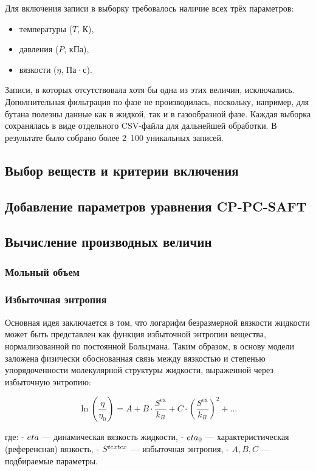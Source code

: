 \documentclass[a4paper,12pt]{article}
\begin{document}
  Для включения записи в выборку требовалось наличие всех трёх параметров:
  \begin{itemize}
    \item температуры (\( T \), К),
    \item давления (\( P \), кПа),
    \item вязкости (\( \eta \), Па·с).
  \end{itemize}
  
  Записи, в которых отсутствовала хотя бы одна из этих величин, исключались. Дополнительная фильтрация по фазе не производилась, поскольку, например, для бутана полезны данные как в жидкой, так и в газообразной фазе. Каждая выборка сохранялась в виде отдельного CSV-файла для дальнейшей обработки. В результате было собрано более 2~100 уникальных записей.
  
  \subsection{Выбор веществ и критерии включения}
  \subsection{Добавление параметров уравнения CP-PC-SAFT}
  \subsection{Вычисление производных величин}
    \subsubsection{Мольный объем}
    \subsubsection{Избыточная энтропия}

Основная идея заключается в том, что логарифм безразмерной вязкости жидкости может быть представлен как функция избыточной энтропии вещества, нормализованной по постоянной Больцмана. Таким образом, в основу модели заложена физически обоснованная связь между вязкостью и степенью упорядоченности молекулярной структуры жидкости, выраженной через избыточную энтропию:

\[
\ln \left( \frac{\eta}{\eta_0} \right) = A + B \cdot \frac{S^{\text{ex}}}{k_B} + C \cdot \left(\frac{S^{\text{ex}}}{k_B} \right)^2 + \ldots
\]

где:
- \( \\eta \) — динамическая вязкость жидкости,
- \( \\eta_0 \) — характеристическая (референсная) вязкость,
- \( S^{\\text{ex}} \) — избыточная энтропия,
- \( A, B, C \) — подбираемые параметры.
\end{document}
